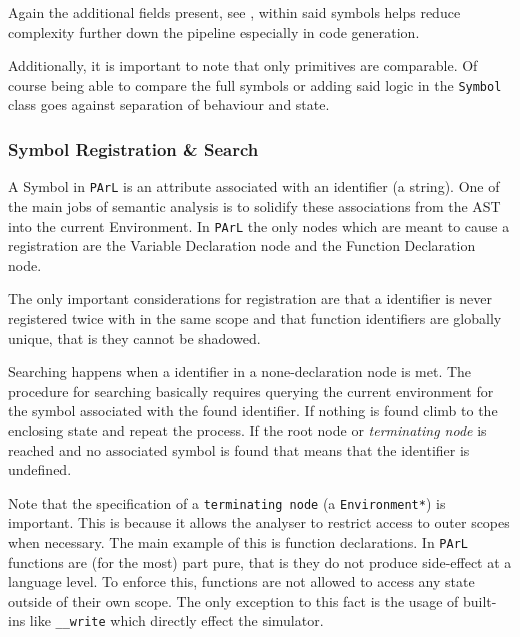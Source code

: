 Again the additional fields present, see ,
within said symbols helps reduce complexity further down the
pipeline especially in code generation.

Additionally, it is important to note that only primitives are
comparable. Of course being able to compare the full symbols or
adding said logic in the \texttt{Symbol} class goes against
separation of behaviour and state.

\subsubsection{Symbol Registration \& Search}

A Symbol in \texttt{PArL} is an attribute associated with an
identifier (a string). One of the main jobs of semantic analysis
is to solidify these associations from the AST into the current
Environment. In \texttt{PArL} the only nodes which are meant to
cause a registration are the Variable Declaration node and the
Function Declaration node.

The only important considerations for registration are that a
identifier is never registered twice with in the same scope and
that function identifiers are globally unique, that is they
cannot be shadowed.



Searching happens when a identifier in a none-declaration node
is met. The procedure for searching basically requires querying
the current environment for the symbol associated with the found
identifier. If nothing is found climb to the enclosing state and
repeat the process. If the root node or \emph{terminating node}
is reached and no associated symbol is found that means that the
identifier is undefined.

Note that the specification of a \texttt{terminating node} (a
\texttt{Environment*}) is important. This is because it allows
the analyser to restrict access to outer scopes when necessary.
The main example of this is function declarations. In
\texttt{PArL} functions are (for the most) part pure, that is
they do not produce side-effect at a language level. To enforce
this, functions are not allowed to access any state outside of
their own scope. The only exception to this fact is the usage of
built-ins like \texttt{__write} which directly effect the
simulator.


